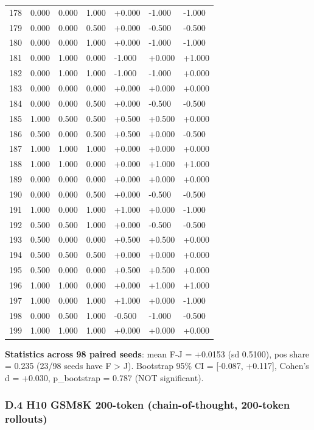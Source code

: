 \documentclass[11pt]{article}
\begin{document}
{\begin{longtable}[]{@{}lllllll@{}}
178 & 0.000 & 0.000 & 1.000 & +0.000 & -1.000 & -1.000 \\
179 & 0.000 & 0.000 & 0.500 & +0.000 & -0.500 & -0.500 \\
180 & 0.000 & 0.000 & 1.000 & +0.000 & -1.000 & -1.000 \\
181 & 0.000 & 1.000 & 0.000 & -1.000 & +0.000 & +1.000 \\
182 & 0.000 & 1.000 & 1.000 & -1.000 & -1.000 & +0.000 \\
183 & 0.000 & 0.000 & 0.000 & +0.000 & +0.000 & +0.000 \\
184 & 0.000 & 0.000 & 0.500 & +0.000 & -0.500 & -0.500 \\
185 & 1.000 & 0.500 & 0.500 & +0.500 & +0.500 & +0.000 \\
186 & 0.500 & 0.000 & 0.500 & +0.500 & +0.000 & -0.500 \\
187 & 1.000 & 1.000 & 1.000 & +0.000 & +0.000 & +0.000 \\
188 & 1.000 & 1.000 & 0.000 & +0.000 & +1.000 & +1.000 \\
189 & 0.000 & 0.000 & 0.000 & +0.000 & +0.000 & +0.000 \\
190 & 0.000 & 0.000 & 0.500 & +0.000 & -0.500 & -0.500 \\
191 & 1.000 & 0.000 & 1.000 & +1.000 & +0.000 & -1.000 \\
192 & 0.500 & 0.500 & 1.000 & +0.000 & -0.500 & -0.500 \\
193 & 0.500 & 0.000 & 0.000 & +0.500 & +0.500 & +0.000 \\
194 & 0.500 & 0.500 & 0.500 & +0.000 & +0.000 & +0.000 \\
195 & 0.500 & 0.000 & 0.000 & +0.500 & +0.500 & +0.000 \\
196 & 1.000 & 1.000 & 0.000 & +0.000 & +1.000 & +1.000 \\
197 & 1.000 & 0.000 & 1.000 & +1.000 & +0.000 & -1.000 \\
198 & 0.000 & 0.500 & 1.000 & -0.500 & -1.000 & -0.500 \\
199 & 1.000 & 1.000 & 1.000 & +0.000 & +0.000 & +0.000 \\
\end{longtable}
}

\textbf{Statistics across 98 paired seeds}: mean F-J = +0.0153 (sd
0.5100), pos share = 0.235 (23/98 seeds have F \textgreater{} J).
Bootstrap 95\% CI = {[}-0.087, +0.117{]}, Cohen's d = +0.030,
p\_bootstrap = 0.787 (NOT significant).

\subsubsection{D.4 H10 GSM8K 200-token (chain-of-thought, 200-token
rollouts)}\label{d.4-h10-gsm8k-200-token-chain-of-thought-200-token-rollouts}
\end{document}

